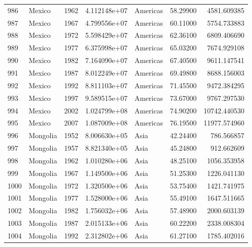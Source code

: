 \documentclass[
  letterpaper,
  DIV=11,
  numbers=noendperiod]{scrreprt}
\begin{document}
\begin{tabular}{llrrlrr}
986  &                    Mexico &  1962 &  4.112148e+07 &  Americas &  58.29900 &    4581.609385 \\
987  &                    Mexico &  1967 &  4.799556e+07 &  Americas &  60.11000 &    5754.733883 \\
988  &                    Mexico &  1972 &  5.598429e+07 &  Americas &  62.36100 &    6809.406690 \\
989  &                    Mexico &  1977 &  6.375998e+07 &  Americas &  65.03200 &    7674.929108 \\
990  &                    Mexico &  1982 &  7.164090e+07 &  Americas &  67.40500 &    9611.147541 \\
991  &                    Mexico &  1987 &  8.012249e+07 &  Americas &  69.49800 &    8688.156003 \\
992  &                    Mexico &  1992 &  8.811103e+07 &  Americas &  71.45500 &    9472.384295 \\
993  &                    Mexico &  1997 &  9.589515e+07 &  Americas &  73.67000 &    9767.297530 \\
994  &                    Mexico &  2002 &  1.024799e+08 &  Americas &  74.90200 &   10742.440530 \\
995  &                    Mexico &  2007 &  1.087009e+08 &  Americas &  76.19500 &   11977.574960 \\
996  &                  Mongolia &  1952 &  8.006630e+05 &      Asia &  42.24400 &     786.566857 \\
997  &                  Mongolia &  1957 &  8.821340e+05 &      Asia &  45.24800 &     912.662609 \\
998  &                  Mongolia &  1962 &  1.010280e+06 &      Asia &  48.25100 &    1056.353958 \\
999  &                  Mongolia &  1967 &  1.149500e+06 &      Asia &  51.25300 &    1226.041130 \\
1000 &                  Mongolia &  1972 &  1.320500e+06 &      Asia &  53.75400 &    1421.741975 \\
1001 &                  Mongolia &  1977 &  1.528000e+06 &      Asia &  55.49100 &    1647.511665 \\
1002 &                  Mongolia &  1982 &  1.756032e+06 &      Asia &  57.48900 &    2000.603139 \\
1003 &                  Mongolia &  1987 &  2.015133e+06 &      Asia &  60.22200 &    2338.008304 \\
1004 &                  Mongolia &  1992 &  2.312802e+06 &      Asia &  61.27100 &    1785.402016 \\

\end{tabular}
\end{document}
